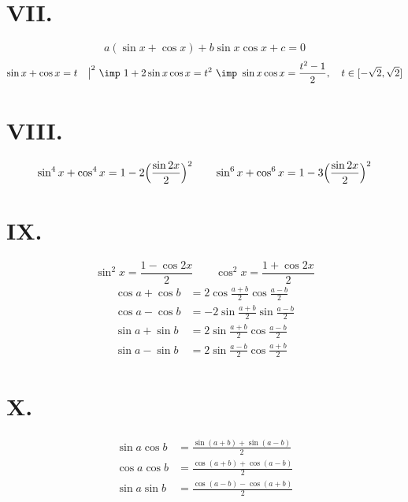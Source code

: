 \section{VII.\ }
\[
a(\sin x+\cos x)+b\sin x\cos x+c=0
\]
\[
\sin x+\cos x=t\quad\bigl|^2\ \imp\ 1+2\sin x\cos x=t^2\ \imp\ \sin x\cos x=\frac{t^2-1}{2},\quad t\in[-\sqrt2,\sqrt2]
\]

\section{VIII.\ }
\[
\sin^4x+\cos^4x=1-2\Bigl(\frac{\sin2x}{2}\Bigr)^2\qquad
\sin^6x+\cos^6x=1-3\Bigl(\frac{\sin2x}{2}\Bigr)^2
\]

\section{IX.\ }
\[
\sin^2x=\frac{1-\cos2x}{2}\qquad\cos^2x=\frac{1+\cos2x}{2}
\]
\[
\begin{aligned}
\cos a+\cos b&=2\cos\frac{a+b}{2}\cos\frac{a-b}{2}\\
\cos a-\cos b&=-2\sin\frac{a+b}{2}\sin\frac{a-b}{2}\\
\sin a+\sin b&=2\sin\frac{a+b}{2}\cos\frac{a-b}{2}\\
\sin a-\sin b&=2\sin\frac{a-b}{2}\cos\frac{a+b}{2}
\end{aligned}
\]

\section{X.\ }
\[
\begin{aligned}
\sin a\cos b&=\frac{\sin(a+b)+\sin(a-b)}{2}\\
\cos a\cos b&=\frac{\cos(a+b)+\cos(a-b)}{2}\\
\sin a\sin b&=\frac{\cos(a-b)-\cos(a+b)}{2}
\end{aligned}
\]


